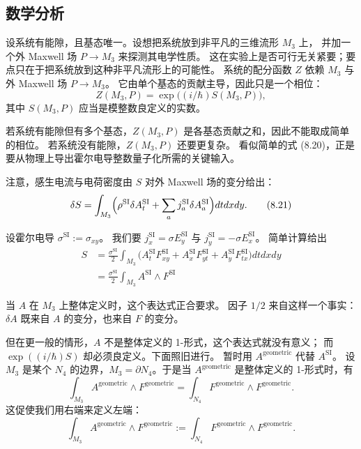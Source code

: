 \subsection{数学分析}

设系统有能隙，且基态唯一。设想把系统放到非平凡的三维流形 $M_3$ 上，
并加一个外 Maxwell 场 $P\to M_3$ 来探测其电学性质。
这在实验上是否可行无关紧要；要点只在于把系统放到这种非平凡流形上的可能性。
系统的配分函数 $Z$ 依赖 $M_3$ 与外 Maxwell 场 $P\to M_3$。
它由单个基态的贡献主导，因此只是一个相位：
\begin{equation}
Z(M_3,P)=\exp\bigl((i/\hbar)S(M_3,P)\bigr),
\tag{8.20}
\end{equation}
其中 $S(M_3,P)$ 应当是模整数良定义的实数。

若系统有能隙但有多个基态，$Z(M_3,P)$ 是各基态贡献之和，因此不能取成简单的相位。
若系统没有能隙，$Z(M_3,P)$ 还要更复杂。
看似简单的式 (8.20)，正是要从物理上导出霍尔电导整数量子化所需的关键输入。

注意，感生电流与电荷密度由 $S$ 对外 Maxwell 场的变分给出：
\begin{equation}
\delta S=\int_{M_3}\Bigl(\rho^{\text{SI}}\delta A_t^{\text{SI}}
+\sum_aj_a^{\text{SI}}\delta A_a^{\text{SI}}\Bigr)dtdxdy.
\tag{8.21}
\end{equation}

设霍尔电导 $\sigma^{\text{SI}}:=\sigma_{xy}$。
我们要 $j_x^{\text{SI}}=\sigma E_y^{\text{SI}}$ 与 $j_y^{\text{SI}}=-\sigma E_x^{\text{SI}}$。
简单计算给出
\begin{align}
S&=\frac{\sigma^{\text{SI}}}{2}\int_{M_3}
\bigl(A_t^{\text{SI}}F_{xy}^{\text{SI}}+A_x^{\text{SI}}F_{yt}^{\text{SI}}
+A_y^{\text{SI}}F_{tx}^{\text{SI}}\bigr)dtdxdy \tag{8.22}\\
&=\frac{\sigma^{\text{SI}}}{2}\int_{M_3}A^{\text{SI}}\wedge F^{\text{SI}} \tag{8.23}
\end{align}

当 $A$ 在 $M_3$ 上整体定义时，这个表达式正合要求。
因子 $1/2$ 来自这样一个事实：$\delta A$ 既来自 $A$ 的变分，也来自 $F$ 的变分。

但在更一般的情形，$A$ 不是整体定义的 1-形式，这个表达式就没有意义；
而 $\exp((i/\hbar)S)$ 却必须良定义。下面照旧进行。
暂时用 $A^{\text{geometric}}$ 代替 $A^{\text{SI}}$。
设 $M_3$ 是某个 $N_4$ 的边界，$M_3=\partial N_4$。于是当 $A^{\text{geometric}}$
是整体定义的 1-形式时，有
\begin{equation}
\int_{M_3}A^{\text{geometric}}\wedge F^{\text{geometric}}
=\int_{N_4}F^{\text{geometric}}\wedge F^{\text{geometric}}.
\tag{8.24}
\end{equation}
这促使我们用右端来定义左端：
\begin{equation}
\int_{M_3}A^{\text{geometric}}\wedge F^{\text{geometric}}
:=\int_{N_4}F^{\text{geometric}}\wedge F^{\text{geometric}}.
\tag{8.25}
\end{equation}

